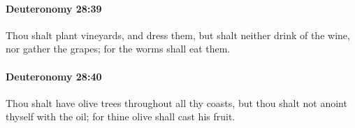 		\paragraph{Deuteronomy 28:39} %
			\label{DEUTERONOMY-28-39}

			Thou shalt plant vineyards, and dress them, but shalt neither drink of the wine, nor gather the grapes; for the worms shall eat them.


		\paragraph{Deuteronomy 28:40} %
			\label{DEUTERONOMY-28-40}

			Thou shalt have olive trees throughout all thy coasts, but thou shalt not anoint thyself with the oil; for thine olive shall cast his fruit.


